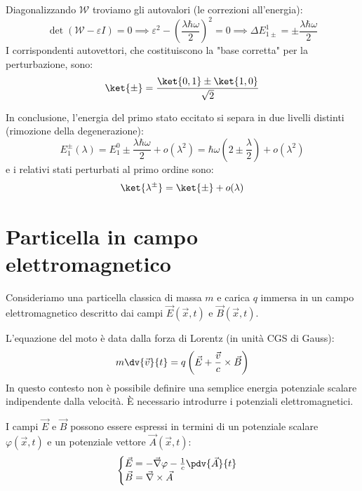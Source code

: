 Diagonalizzando $\mathcal{W}$ troviamo gli autovalori (le correzioni all'energia):
\[
    \det(\mathcal{W} - \varepsilon I) = 0 \implies \varepsilon^2 - \left(\frac{\lambda\hbar\omega}{2}\right)^2 = 0 \implies \Delta E_{1\pm}^1 = \pm \frac{\lambda \hbar \omega}{2}
\]
I corrispondenti autovettori, che costituiscono la "base corretta" per la perturbazione, sono:
\[
    \ket{\pm} = \frac{\ket{0,1} \pm \ket{1,0}}{\sqrt{2}}
\]

In conclusione, l'energia del primo stato eccitato si separa in due livelli distinti (rimozione della degenerazione):
\begin{equation}
    E_1^{\pm}(\lambda) = E_1^0 \pm \frac{\lambda \hbar \omega}{2} + o(\lambda^2) = \hbar\omega \left( 2 \pm \frac{\lambda}{2} \right) + o(\lambda^2)
\end{equation}
e i relativi stati perturbati al primo ordine sono:
\begin{equation}
    \ket{\lambda^{\pm}} = \ket{\pm} + o(\lambda)
\end{equation}



\section{Particella in campo elettromagnetico}

Consideriamo una particella classica di massa \( m \) e carica \( q \) immersa in un campo elettromagnetico descritto dai campi \( \vec{E}(\vec{x},t) \) e \( \vec{B}(\vec{x},t) \).

L'equazione del moto è data dalla forza di Lorentz (in unità CGS di Gauss):
\begin{equation}
    m \dv{\vec{v}}{t} = q \left( \vec{E} + \frac{\vec{v}}{c} \times \vec{B} \right)
\end{equation}
In questo contesto non è possibile definire una semplice energia potenziale scalare indipendente dalla velocità. È necessario introdurre i potenziali elettromagnetici.

I campi \( \vec{E} \) e \( \vec{B} \) possono essere espressi in termini di un potenziale scalare \( \varphi(\vec{x},t) \) e un potenziale vettore \( \vec{A}(\vec{x},t) \):
\begin{equation}
    \begin{cases}
            \vec{E} = - \vec{\nabla}\varphi - \frac{1}{c} \pdv{\vec{A}}{t} \\
            \vec{B} = \vec{\nabla} \times \vec{A}
        \end{cases}
\end{equation}

